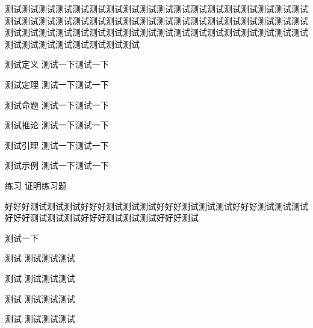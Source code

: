 测试测试测试测试测试测试测试测试测试测试测试测试测试测试测试测试测试测试测试测试测试测试测试测试测试测试测试测试测试测试测试测试测试测试测试测试测试测试测试测试测试测试测试测试测试测试测试测试测试测试测试测试测试测试测试测试测试测试测试测试测试测试

\begin{definition}{测试定义}
	测试一下测试一下
\end{definition}

\begin{theorem}{测试定理}
	测试一下测试一下
\end{theorem}

\begin{proposition}{测试命题}
	测试一下测试一下
\end{proposition}

\begin{corollary}{测试推论}
	测试一下测试一下
\end{corollary}

\begin{lemma}{测试引理}
	测试一下测试一下
\end{lemma}

\begin{example}{测试示例}
	测试一下测试一下
\end{example}

\begin{exercise}{练习}
	证明练习题
\end{exercise}

\begin{prove}
	好好好测试测试测试好好好测试测试测试好好好测试测试测试好好好测试测试测试好好好测试测试测试好好好测试测试测试好好好测试
\end{prove}

\begin{remark}
	测试一下
\end{remark}


\newpage
\begin{box1}{测试}
	测试测试测试
\end{box1}

\begin{box2}{测试}
	测试测试测试
\end{box2}

\begin{box3}{测试}
	测试测试测试
\end{box3}

\begin{box4}{测试}
	测试测试测试
\end{box4}